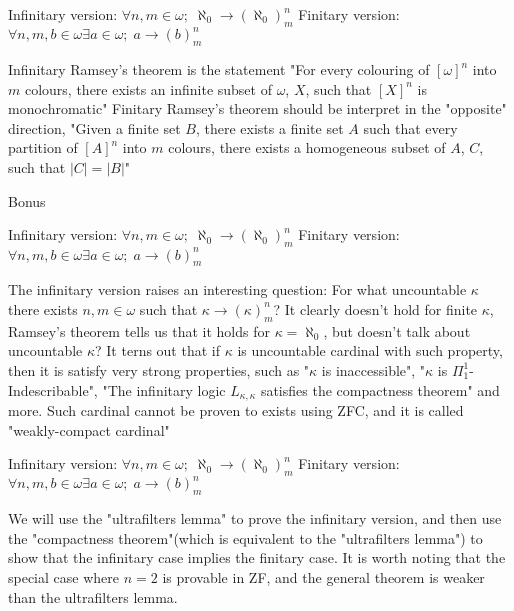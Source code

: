 	\begin{frame}
		\begin{theorem}
			Infinitary version: $\forall n,m\in\omega;\; \aleph_0\to(\aleph_0)_m^n$\newline
			Finitary version: $\forall n,m,b\in\omega\exists a\in\omega;\; a\to(b)^n_m$
		\end{theorem}\pause
		Infinitary Ramsey's theorem is the statement "For every colouring of $[\omega]^n$ into $m$ colours, there exists an infinite subset of $\omega$, $X$, such that $[X]^n$ is monochromatic"\pause\newline
		Finitary Ramsey's theorem should be interpret in the "opposite" direction, "Given a finite set $B$, there exists a finite set $A$ such that every partition of $[A]^n$ into $m$ colours, there exists a homogeneous subset of $A$, $C$, such that $|C|=|B|$"
	\end{frame}
	\begin{frame}
		Bonus
		\begin{theorem}
			Infinitary version: $\forall n,m\in\omega;\; \aleph_0\to(\aleph_0)_m^n$\newline
			Finitary version: $\forall n,m,b\in\omega\exists a\in\omega;\; a\to(b)^n_m$
		\end{theorem}
		The infinitary version raises an interesting question: For what uncountable $\kappa$ there exists $n,m\in\omega$ such that $\kappa\to(\kappa)_m^n$?\pause\newline
		It clearly doesn't hold for finite $\kappa$, Ramsey's theorem tells us that it holds for $\kappa=\aleph_0$, but doesn't talk about uncountable $\kappa$? \pause It terns out that if $\kappa$ is uncountable cardinal with such property, then it is satisfy very strong properties, such as "$\kappa$ is inaccessible", "$\kappa$ is $\Pi_1^1$-Indescribable", "The infinitary logic $L_{\kappa,\kappa}$ satisfies the compactness theorem" and more.\pause\newline
		Such cardinal cannot be proven to exists using ZFC, and it is called "weakly-compact cardinal"
	\end{frame}
	\begin{frame}
		\begin{theorem}
			Infinitary version: $\forall n,m\in\omega;\; \aleph_0\to(\aleph_0)_m^n$\newline
			Finitary version: $\forall n,m,b\in\omega\exists a\in\omega;\; a\to(b)^n_m$
		\end{theorem}\pause
		We will use the "ultrafilters lemma" to prove the infinitary version, and then use the "compactness theorem"(which is equivalent to the "ultrafilters lemma") to show that the infinitary case implies the finitary case.\pause\newline
		It is worth noting that the special case where $n=2$ is provable in ZF, and the general theorem is weaker than the ultrafilters lemma.
	\end{frame}

